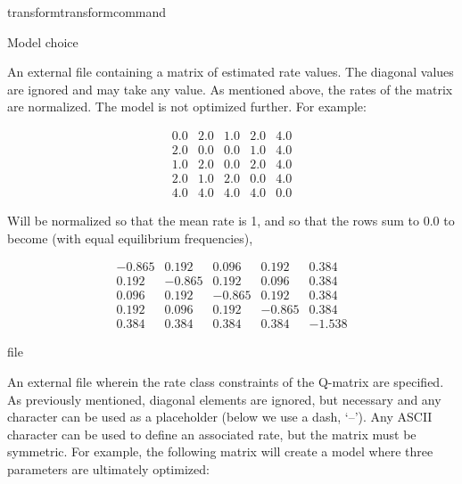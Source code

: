 \begin{command}{transform}{transformcommand}
\begin{arguments}
\begin {argumentgroup} {Model choice}
                {An external file containing a matrix of estimated rate
                values. The diagonal values are ignored and may take any
                value. As mentioned above, the rates of the matrix are
                normalized. The model is not optimized further. For example:

                \begin{equation*}
                    \begin{array}{ccccc}
                        0.0 & 2.0 & 1.0 & 2.0 & 4.0 \\
                        2.0 & 0.0 & 0.0 & 1.0 & 4.0 \\
                        1.0 & 2.0 & 0.0 & 2.0 & 4.0 \\
                        2.0 & 1.0 & 2.0 & 0.0 & 4.0 \\
                        4.0 & 4.0 & 4.0 & 4.0 & 0.0
                     \end{array}
                \end{equation*} 

                Will be normalized so that the mean rate is 1, and so
                that the rows sum to 0.0 to become (with equal equilibrium
                frequencies),

                \begin{equation*}
                    \begin{array}{rrrrr}
                        -0.865 &  0.192 &  0.096 &  0.192 &  0.384 \\
                         0.192 & -0.865 &  0.192 &  0.096 &  0.384 \\
                         0.096 &  0.192 & -0.865 &  0.192 &  0.384 \\
                         0.192 &  0.096 &  0.192 & -0.865 &  0.384 \\
                         0.384 &  0.384 &  0.384 &  0.384 & -1.538
                     \end{array}
                \end{equation*} }
                {file}

                {An external file wherein the rate class constraints of
                the Q-matrix are specified. As previously mentioned,
                diagonal elements are ignored, but necessary and any character can
                be used as a placeholder (below we use a dash, `--'). Any
                ASCII character can be used to define an associated
                rate, but the matrix must be symmetric. For example, the
                following matrix will create a model where three
                parameters are ultimately optimized:

}
\end{argumentgroup}
\end{arguments}
\end{command}
